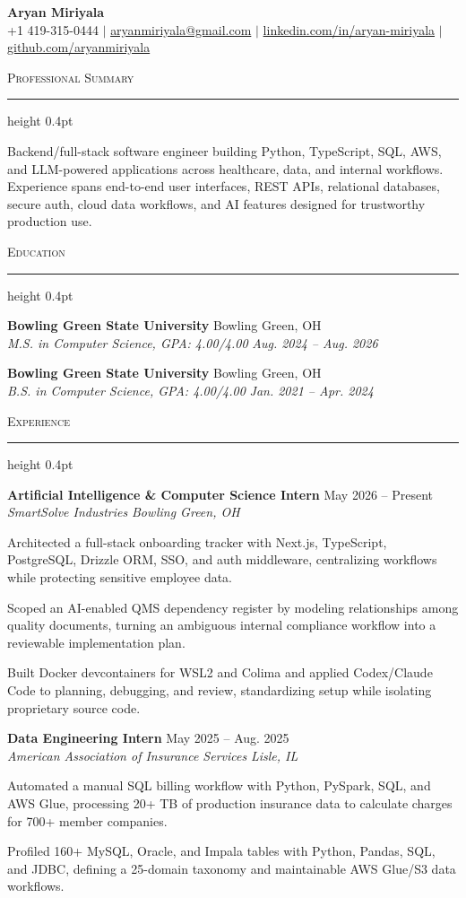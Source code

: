 \documentclass[letterpaper,11pt]{article}
\newcommand{\resumesection}[1]{%
  \par\vspace{2pt}%
  {\large\scshape #1}\par\vspace{2pt}%
  \hrule height 0.4pt\vspace{2pt}%
}
\newcommand{\resumeSubheading}[4]{
  \textbf{#1} \hfill #2\\
  \textit{#3} \hfill \textit{#4}
}
\begin{document}
\begin{center}
  {\LARGE \textbf{Aryan Miriyala}}\\[-1pt]
  \small
  +1 419-315-0444 $|$
  \href{mailto:aryanmiriyala@gmail.com}{aryanmiriyala@gmail.com} $|$
  \href{https://www.linkedin.com/in/aryan-miriyala-7788a21b6/}{linkedin.com/in/aryan-miriyala} $|$
  \href{https://github.com/aryanmiriyala}{github.com/aryanmiriyala}
\end{center}\vspace{-10pt}

\resumesection{Professional Summary}
Backend/full-stack software engineer building Python, TypeScript, SQL, AWS, and LLM-powered applications across healthcare, data, and internal workflows. Experience spans end-to-end user interfaces, REST APIs, relational databases, secure auth, cloud data workflows, and AI features designed for trustworthy production use.

\resumesection{Education}
\resumeSubheading
{Bowling Green State University}{Bowling Green, OH}
{M.S. in Computer Science, GPA: 4.00/4.00}{Aug. 2024 -- Aug. 2026}

\resumeSubheading
{Bowling Green State University}{Bowling Green, OH}
{B.S. in Computer Science, GPA: 4.00/4.00}{Jan. 2021 -- Apr. 2024}

\resumesection{Experience}
\resumeSubheading
{Artificial Intelligence \& Computer Science Intern}{May 2026 -- Present}
{SmartSolve Industries}{Bowling Green, OH}
\begin{tightitemize}
  \item Architected a full-stack onboarding tracker with Next.js, TypeScript, PostgreSQL, Drizzle ORM, SSO, and auth middleware, centralizing workflows while protecting sensitive employee data.
  \item Scoped an AI-enabled QMS dependency register by modeling relationships among quality documents, turning an ambiguous internal compliance workflow into a reviewable implementation plan.
  \item Built Docker devcontainers for WSL2 and Colima and applied Codex/Claude Code to planning, debugging, and review, standardizing setup while isolating proprietary source code.
\end{tightitemize}

\resumeSubheading
{Data Engineering Intern}{May 2025 -- Aug. 2025}
{American Association of Insurance Services}{Lisle, IL}
\begin{tightitemize}
  \item Automated a manual SQL billing workflow with Python, PySpark, SQL, and AWS Glue, processing 20+ TB of production insurance data to calculate charges for 700+ member companies.
  \item Profiled 160+ MySQL, Oracle, and Impala tables with Python, Pandas, SQL, and JDBC, defining a 25-domain taxonomy and maintainable AWS Glue/S3 data workflows.
\end{tightitemize}
\end{document}
